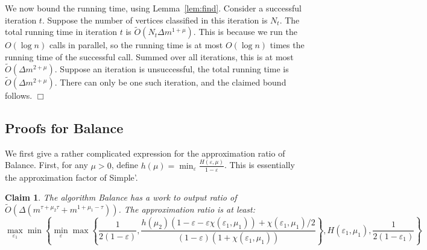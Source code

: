 \documentclass[11pt]{article}
\newtheorem{claim}[theorem]{Claim}
\newenvironment{myproof}{\noindent {\sc Proof:}}{$\Box$}
\def\epsilon{\varepsilon}
\newcommand\Balance{{\sc Balance}\xspace}
\newcommand\Simple{{\sc Simple}\xspace}
\newcommand\otilde{\widetilde{O}}
\begin{document}
\begin{myproof}
We now bound the running time, using Lemma~\ref{lem:find}. Consider a successful iteration $t$.
Suppose the number of vertices classified in this iteration is $N_t$.
The total running time in iteration $t$ is
$\otilde(N_t\Delta m^{1+\mu})$. This is because we run the $O(\log n)$ calls
in parallel, so the running time is at most $O(\log n)$ times
the running time of the successful call. Summed over all
iterations, this is at most $\otilde(\Delta m^{2+\mu})$. Suppose
an iteration is unsuccessful, the total running time
is $\otilde(\Delta m^{2+\mu})$. There can only be one such iteration,
and the claimed bound follows.
\end{myproof}


\subsection{Proofs for {\Balance}}

We first give a rather complicated expression for the approximation ratio
of {\Balance}. First, for any $\mu > 0$, define $h(\mu) = \min_\epsilon \frac{H(\epsilon, \mu)}{1-\epsilon}$. This is essentially the approximation factor of \Simple'.

\begin{claim} \label{clm:threehalf} The algorithm {\Balance} has a work to output ratio
of $\otilde(\Delta (m^{\tau+\mu_2\tau} + m^{1+\mu_1-\tau}))$. The approximation ratio
is at least:
$$ \max_{\epsilon_1}\min\left\{
\min_{\epsilon} \max\left\{\frac{1}{2(1-\epsilon)},
\frac{h(\mu_2) (1-\epsilon-\epsilon\chi(\epsilon_1,\mu_1)) + \chi(\epsilon_1, \mu_1)/2}{(1-\epsilon)(1+\chi(\epsilon_1,\mu_1))}
\right\},
H(\epsilon_1,\mu_1), \frac{1}{2(1-\epsilon_1)}
\right\} $$
\end{claim}
\end{document}
